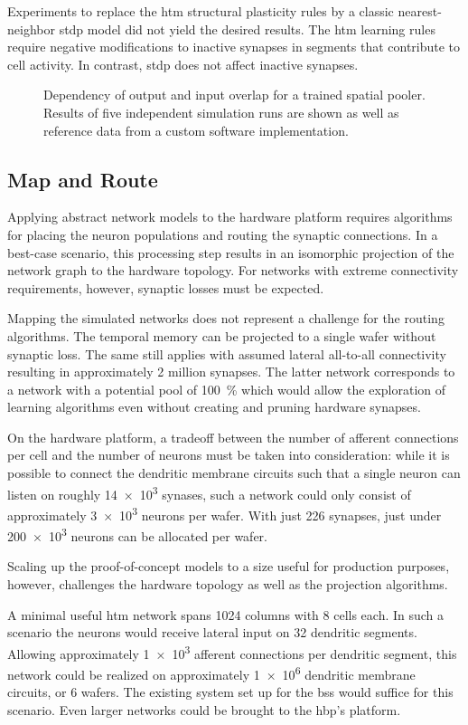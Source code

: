 Experiments to replace the \gls{htm} structural plasticity rules by a classic
nearest-neighbor \gls{stdp} model did not yield the desired results. The
\gls{htm} learning rules require negative modifications to inactive synapses in
segments that contribute to cell activity. In contrast, \gls{stdp} does not
affect inactive synapses.


\begin{figure}
	\begin{center}
		
	\end{center}
	\caption{Dependency of output and input overlap for a trained spatial pooler. Results of five independent simulation runs are shown as well as reference data from a custom software implementation.}
	\label{fig:spatial_pooler_learning}
\end{figure}

\subsection{Map and Route}

Applying abstract network models to the hardware platform requires algorithms for placing the neuron populations and routing the synaptic connections. In a best-case scenario, this processing step results in an isomorphic projection of the network graph to the hardware topology. For networks with extreme connectivity requirements, however, synaptic losses must be expected.

Mapping the simulated networks does not represent a challenge for the routing algorithms. The temporal memory can be projected to a single wafer without synaptic loss. The same still applies with assumed lateral all-to-all connectivity resulting in approximately 2 million synapses. The latter network corresponds to a network with a potential pool of \SI{100}{\%} which would allow the exploration of learning algorithms even without creating and pruning hardware synapses.

On the hardware platform, a tradeoff between the number of afferent connections
per cell and the number of neurons must be taken into consideration: while it is
possible to connect the dendritic membrane circuits such that a single neuron
can listen on roughly \num{14e3} synases, such a network could only consist of
approximately \num{3e3} neurons per wafer. With just 226 synapses, just under
\num{200e3} neurons can be allocated per wafer.

Scaling up the proof-of-concept models to a size useful for production purposes, however, challenges the hardware topology as well as the projection algorithms.

A minimal useful \gls{htm} network spans 1024 columns with 8 cells each. In such a scenario the neurons would receive lateral input on 32 dendritic segments. Allowing approximately \num{1e3} afferent connections per dendritic segment, this network could be realized on approximately \num{1e6} dendritic membrane circuits, or 6 wafers. The existing system set up for the \gls{bss} would suffice for this scenario. Even larger networks could be brought to the \gls{hbp}'s platform.
